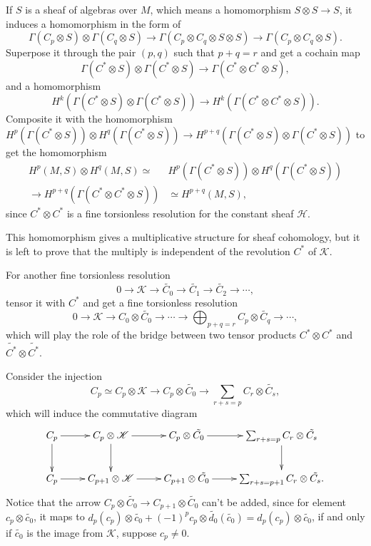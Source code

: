 \documentclass[twoside]{article}
\begin{document}
If $S$ is a sheaf of algebras over $M$, which means a homomorphism $S\otimes S\to S$, it induces a homomorphism in the form of $$
\Gamma(C_p\otimes S)\otimes \Gamma(C_q\otimes S)\to \Gamma(C_p\otimes C_q\otimes S\otimes S)\to \Gamma(C_p\otimes C_q\otimes S).
$$
Superpose it through the pair $(p,q)$ such that $p+q=r$ and get a cochain map $$
\Gamma(C^*\otimes S)\otimes \Gamma(C^*\otimes S)\to \Gamma(C^*\otimes C^*\otimes S),
$$
and a  homomorphism $$
H^k(\Gamma(C^*\otimes S)\otimes \Gamma(C^*\otimes S))\to H^k(\Gamma(C^*\otimes C^*\otimes S)).
$$
Composite it with the homomorphism $H^p(\Gamma(C^*\otimes S))\otimes H^q(\Gamma(C^*\otimes S))\to H^{p+q}(\Gamma(C^*\otimes S)\otimes \Gamma(C^*\otimes S))$ to get the homomorphism
$$\begin{aligned}
H^p(M,S)\otimes H^q(M,S)\simeq& H^p(\Gamma(C^*\otimes S))\otimes H^q(\Gamma(C^*\otimes S))\\
\to H^{p+q}(\Gamma(C^*\otimes C^*\otimes S))&\simeq H^{p+q}(M,S),
\end{aligned}
$$
since  $C^*\otimes C^*$ is a fine torsionless resolution for the constant sheaf $\mathscr{H}$.

This homomorphism gives a multiplicative structure for sheaf  cohomology, but it is left to prove that the multiply is independent of the revolution $C^*$ of $\mathscr{K}$.

For another fine torsionless resolution $$
0\to \mathscr{K}\to \tilde{C_0}\to \tilde{C_1}\to \tilde{C_2}\to \cdots,
$$
  tensor it with $C^*$ and get a fine torsionless resolution $$
0\to \mathscr{K}\to C_0\otimes \tilde{C_0}\to \cdots\to \bigoplus_{p+q=r}C_p\otimes \tilde{C_q}\to \cdots,
$$
which will play the role of the bridge between two tensor products  $C^*\otimes C^*$ and $\tilde{C^*}\otimes \tilde{C^*}$.

Consider the injection $$
C_p\simeq C_p\otimes \mathscr{K}\to C_p\otimes \tilde{C_0}\to \sum_{r+s=p}C_r\otimes \tilde{C_s},
$$
which will induce the commutative diagram \begin{equation*}
  \xymatrix{
C_p\ar[r]\ar[d]&C_p\otimes \mathscr{K}\ar[d]\ar[r]&C_p\otimes \tilde{C_0}\ar[r]&\sum_{r+s=p}C_r\otimes \tilde{C_s}\ar[d]\\
C_p\ar[r]&C_{p+1}\otimes \mathscr{K}\ar[r]&C_{p+1}\otimes \tilde{C_0}\ar[r]&\sum_{r+s=p+1}C_r\otimes \tilde{C_s}.\\
  }
\end{equation*}
Notice that  the arrow $C_p\otimes\tilde{C_0}\to C_{p+1}\otimes \tilde{C_0}$ can't be added, since for element $c_p\otimes \tilde{c_0}$, it maps to $d_p(c_p)\otimes \tilde{c_0}+(-1)^pc_p\otimes \tilde{d_0}(\tilde{c_0})=d_p(c_p)\otimes \tilde{c_0}$, if and only if $\tilde{c_0}$ is the  image from $\mathscr{K}$, suppose $c_p\neq 0$.
\end{document}
